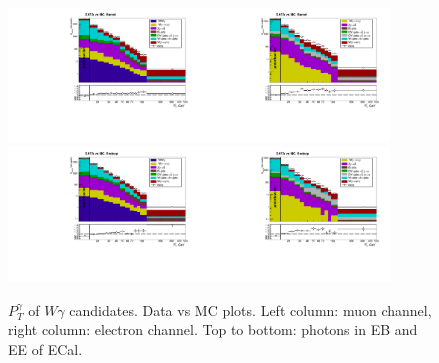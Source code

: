 \begin{figure}[htb]
  \begin{center}
   \includegraphics[width=0.45\textwidth]{../figs/figs_v11/MUON_WGamma/PrepareYields/c_TotalDATAvsMC_Barrel__phoEt.pdf}\includegraphics[width=0.45\textwidth]{../figs/figs_v11/ELECTRON_WGamma/PrepareYields/c_TotalDATAvsMC_Barrel__phoEt.pdf}
   \includegraphics[width=0.45\textwidth]{../figs/figs_v11/MUON_WGamma/PrepareYields/c_TotalDATAvsMC_Endcap__phoEt.pdf}\includegraphics[width=0.45\textwidth]{../figs/figs_v11/ELECTRON_WGamma/PrepareYields/c_TotalDATAvsMC_Endcap__phoEt.pdf}
  \caption{$P_T^{\gamma}$ of $W\gamma$ candidates. Data vs MC plots. Left column: muon channel, right column: electron channel. Top to bottom: photons in EB and EE of ECal.}
  \label{fig:DATAvsMC}
  \end{center}
\end{figure}



